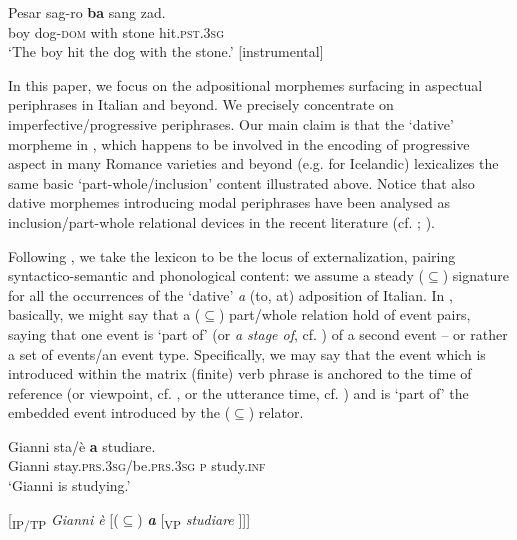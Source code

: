 \documentclass[output=paper,modfonts,nonflat,newtxmath,colorlinks,citecolor=brown]{langsci/langscibook}
\begin{document}
     \ex  \label{ex:franco:7b}
    \gll Pesar sag-ro  \textbf{ba} sang zad.\\
        boy dog-\textsc{dom}  with   stone   hit.\textsc{pst.3sg} \\
    \glt ‘The boy hit the dog with the stone.’ \hfill [instrumental]
    \z
    \z

In this paper, we focus on the adpositional morphemes surfacing in aspectual periphrases in Italian and beyond. We precisely concentrate on imperfective/progressive periphrases. Our main claim is that the ‘dative’ morpheme in , which happens to be involved in the encoding of progressive aspect in many Romance varieties \citep{ManziniLorussoSavoia2017} and beyond (e.g. \citealt{Johannsdottir2011} for Icelandic) lexicalizes the same basic ‘part-whole/inclusion’ content illustrated above. Notice that also dative morphemes introducing modal periphrases have been analysed as inclusion/part-whole relational devices in the recent literature (cf. \citealt{BjorkmanCowper2016}; ). 

Following \citet{BerwickChomsky2011}, we take the lexicon to be the locus of externalization, pairing syntactico-semantic and phonological content: we assume a steady (${\subseteq}$) signature for all the occurrences of the ‘dative’ \textit{a} (to, at) adposition of Italian. In , basically, we might say that a (${\subseteq}$) part/whole relation hold of event pairs, saying that one event is ‘part of’ (or \textit{a stage of}, cf. \citealt{Landman1992}) of a second event – or rather a set of events/an event type. Specifically, we may say that the event which is introduced within the matrix (finite) verb phrase is anchored to the time of reference (or viewpoint, cf. \citealt{Comrie1976}, or the utterance time, cf. \citealt{Higginbotham2009}) and is ‘part of’ the embedded event introduced by the (${\subseteq}$) relator. %

\ea%
    \label{ex:franco:8}
    \ea \label{ex:franco:8a}
    \gll Gianni sta/è \textbf{a} studiare.\\
        Gianni stay.\textsc{prs.3sg}/be.\textsc{prs.3sg} \textsc{p} study.\textsc{inf}\\
    \glt ‘Gianni is studying.’
    
     \ex \label{ex:franco:8b}
     {[}\textsubscript{IP/TP} \textit{Gianni è} [(${\subseteq}$) \textit{\textbf{a}} [\textsubscript{VP} \textit{studiare} {]]]}
    \z
    \z
    
\end{document}
